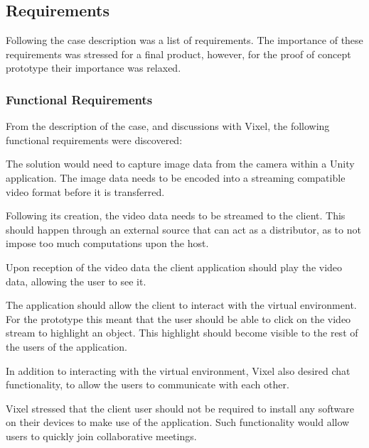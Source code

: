 \subsection{Requirements}
Following the case description was a list of requirements. The importance of these requirements was stressed for a final product, however, for the proof of concept prototype their importance was relaxed.

\subsubsection{Functional Requirements}
From the description of the case, and discussions with Vixel, the following functional requirements were discovered:

The solution would need to capture image data from the camera within a Unity application. The image data needs to be encoded into a streaming compatible video format before it is transferred.

Following its creation, the video data needs to be streamed to the client. This should happen through an external source that can act as a distributor, as to not impose too much computations upon the host.

Upon reception of the video data the client application should play the video data, allowing the user to see it. 

The application should allow the client to interact with the virtual environment. For the prototype this meant that the user should be able to click on the video stream to highlight an object. This highlight should become visible to the rest of the users of the application.

In addition to interacting with the virtual environment, Vixel also desired chat functionality, to allow the users to communicate with each other.

Vixel stressed that the client user should not be required to install any software on their devices to make use of the application. Such functionality would allow users to quickly join collaborative meetings.

